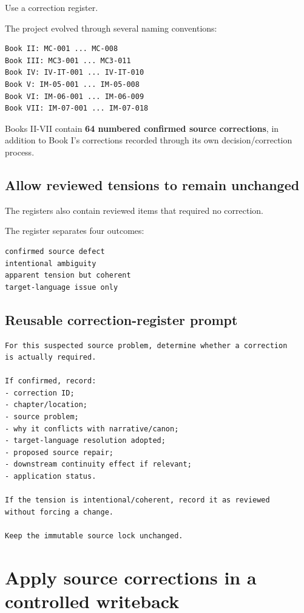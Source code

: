 \documentclass[11pt,oneside,openany]{book}
\begin{document}
Use a correction register.

The project evolved through several naming conventions:

\begin{lstlisting}
Book II: MC-001 ... MC-008
Book III: MC3-001 ... MC3-011
Book IV: IV-IT-001 ... IV-IT-010
Book V: IM-05-001 ... IM-05-008
Book VI: IM-06-001 ... IM-06-009
Book VII: IM-07-001 ... IM-07-018
\end{lstlisting}

Books II-VII contain \textbf{64 numbered confirmed source corrections}, in addition to Book I's corrections recorded through its own decision/correction process.

\section{Allow reviewed tensions to remain unchanged}\label{allow-reviewed-tensions-to-remain-unchanged}

The registers also contain reviewed items that required no correction.

The register separates four outcomes:

\begin{lstlisting}
confirmed source defect
intentional ambiguity
apparent tension but coherent
target-language issue only
\end{lstlisting}

\section{Reusable correction-register prompt}\label{reusable-correction-register-prompt}

\begin{lstlisting}
For this suspected source problem, determine whether a correction
is actually required.

If confirmed, record:
- correction ID;
- chapter/location;
- source problem;
- why it conflicts with narrative/canon;
- target-language resolution adopted;
- proposed source repair;
- downstream continuity effect if relevant;
- application status.

If the tension is intentional/coherent, record it as reviewed
without forcing a change.

Keep the immutable source lock unchanged.
\end{lstlisting}

\chapter{Apply source corrections in a controlled writeback}\label{apply-source-corrections-in-a-controlled-writeback}
\end{document}

